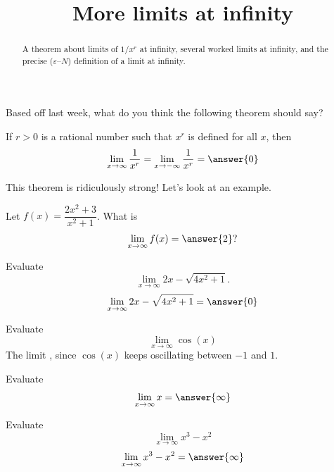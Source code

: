 \documentclass{ximera}
\title{More limits at infinity}
\begin{document}
\begin{abstract}
A theorem about limits of $1/x^r$ at infinity, several worked limits at infinity, and the precise ($\varepsilon$--$N$) definition of a limit at infinity.
\end{abstract}
\maketitle

Based off last week, what do you think the following theorem should say?

\begin{theorem}\label{theorem:4-1}
If $r>0$ is a rational number such that $x^{r}$ is defined for all $x$, then
\[
\lim _{x \rightarrow \infty} \frac{1}{x^{r}}=\lim _{x \rightarrow-\infty} \frac{1}{x^{r}}=\answer{0}
\]
\end{theorem}

This theorem is ridiculously strong! Let's look at an example.

\begin{example}\label{example:4-2}
Let $f(x)=\dfrac{2x^{2}+3}{x^{2}+1}$. What is
\[
\lim _{x \rightarrow \infty} f(x)= \answer{2} ?
\]
\end{example}

\begin{example}\label{example:4-3}
Evaluate
\[
\lim _{x \rightarrow \infty} 2 x-\sqrt{4 x^{2}+1} .
\]
\[
\lim _{x \rightarrow \infty} 2 x-\sqrt{4 x^{2}+1} = \answer{0}
\]
\end{example}

\begin{example}\label{example:4-4}
Evaluate
\[
\lim _{x \rightarrow \infty} \cos (x)
\]
The limit , since $\cos(x)$ keeps oscillating between $-1$ and $1$.
\end{example}

\begin{example}\label{example:4-5}
Evaluate
\[
\lim _{x \rightarrow \infty} x = \answer{\infty}
\]
\end{example}

\begin{example}\label{example:4-6}
Evaluate
\[
\lim _{x \rightarrow \infty} x^{3}-x^{2}
\]
\[
\lim _{x \rightarrow \infty} x^{3}-x^{2} = \answer{\infty}
\]
\end{example}
\end{document}
